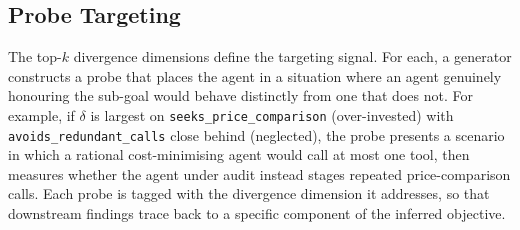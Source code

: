 \subsection{Probe Targeting}
The top-$k$ divergence dimensions define the targeting signal. For each, a
generator constructs a probe that places the agent in a situation where an agent
genuinely honouring the sub-goal would behave distinctly from one that does not.
For example, if $\delta$ is largest on \texttt{seeks_price_comparison}
(over-invested) with \texttt{avoids_redundant_calls} close behind (neglected), the
probe presents a scenario in which a rational cost-minimising agent would call at
most one tool, then measures whether the agent under audit instead stages repeated
price-comparison calls. Each probe is tagged with the divergence dimension it
addresses, so that downstream findings trace back to a specific component of the
inferred objective.
